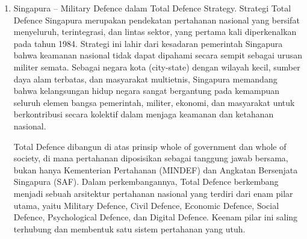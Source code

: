 \begin{enumerate}
  DoD AS membagi transformasi digital pertahanan dalam empat pilar:
  \begin{enumerate}
    \item Innovate for competitive advantage. 
    Inovasi adalah kunci kesiapan masa depan.
    Inovasi sangat penting untuk mempertahankan dan memperluas keunggulan dalam menghadapi persaingan dan ancaman.
    \item Optimize for efficiencies and improved capability.
    Untuk menghadirkan kapabilitas teknologi informasi (TI) dengan efisiensi dan kinerja yang lebih tinggi, Departemen pertahanan harus mereformasi cara operasionalnya.
    Implementasi teknologi harus dipercepat.
    \item Evolve cybersecurity for resilient defense posture.
    Aktivitas siber berbahaya terus meningkat secara global. Departemen harus mengadopsi pola pikir “Utamakan siber, selalu siber”.
    Setiap jaringan, sistem, aplikasi dan layanan perusahaan harus aman sejak awal.
    \item Cultivate talent for a digital workforce.
    Tujuannya untuk menghasilkan tenaga kerja yang memadai,
    terdiri dari para profesional yang terlatih dan berkualifikasi tinggi untuk mendukung dan mempertahankan informasi departemen pertahanan.
  \end{enumerate}
  \item Singapura – Military Defence dalam Total Defence Strategy.
  Strategi Total Defence Singapura merupakan pendekatan pertahanan nasional yang bersifat menyeluruh, terintegrasi, dan lintas sektor, yang pertama kali diperkenalkan pada tahun 1984.
  Strategi ini lahir dari kesadaran pemerintah Singapura bahwa keamanan nasional tidak dapat dipahami secara sempit sebagai urusan militer semata\autocite{Matthews2024}.
  Sebagai negara kota (city-state) dengan wilayah kecil, sumber daya alam terbatas, dan masyarakat multietnis, Singapura memandang bahwa kelangsungan hidup negara sangat bergantung pada kemampuan seluruh elemen bangsa pemerintah, militer, ekonomi, dan masyarakat untuk berkontribusi secara kolektif dalam menjaga keamanan dan ketahanan nasional.

  Total Defence dibangun di atas prinsip whole of government dan whole of society, di mana pertahanan diposisikan sebagai tanggung jawab bersama, bukan hanya Kementerian Pertahanan (MINDEF) dan Angkatan Bersenjata Singapura (SAF).
  Dalam perkembangannya, Total Defence berkembang menjadi sebuah arsitektur pertahanan nasional yang terdiri dari enam pilar utama, yaitu Military Defence, Civil Defence, Economic Defence, Social Defence, Psychological Defence, dan Digital Defence.
  Keenam pilar ini saling terhubung dan membentuk satu sistem pertahanan yang utuh.


\end{enumerate}

